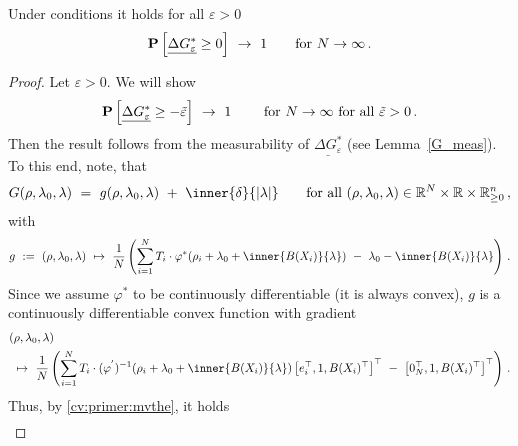  \begin{lemma}
   \label{bw:cd:lem2}
   Under conditions it holds
   for all $\varepsilon>0$
\begin{gather}
   \P
   \left[ 
     \underline{
     \Delta G^*
     _\varepsilon
     }
     \ge 
     0
   \right]
   \ 
   \to
   \ 
   1
   \qquad
   \text{for}
   \ 
   N\to\infty
   \,.
\end{gather}
 \end{lemma}
 \begin{proof}
   Let $\varepsilon>0$.
   We will show
\begin{gather}
   \P
   \left[ 
     \underline{
     \Delta G^*
     _\varepsilon
     }
     \ge 
     -\tilde{\varepsilon}
   \right]
   \ 
   \to
   \ 
   1
   \qquad
   \ 
   \text{for}
   \ 
   N\to\infty
   \ 
   \text{for all}\ 
   \tilde{\varepsilon}>0
   \,.
\end{gather}
Then the result follows from the measurability of 
$
     \underline{
     \Delta G^*
     _\varepsilon
     }
$
(see Lemma~\ref{G_meas}).
To this end, note, that
\begin{gather*}
  G(\rho,\lambda_0,\lambda)
  \ 
  =
  \ 
  g(\rho,\lambda_0,\lambda)
  \ 
  +
  \ 
  \inner{\delta}{|\lambda|}
  \qquad
  \text{for all}\ 
  (\rho,\lambda_0,\lambda)
  \in
  \R^{N}
  \times
  \R
  \times
  \R^n_{\ge 0}
  \,,
\end{gather*}
with
\begin{gather*}
  g
  \ 
  :=
  \ 
  (\rho,\lambda_0,\lambda)
  \ 
  \mapsto
  \ 
     \frac{1}{N}
     \left( 
\sum_{i=1} 
  ^N
  T_i
  \cdot
  \varphi^*
  \!
  \left( 
    \rho_i
    +
\lambda_0
+
\inner
{B(X_i)}
{
\lambda
}
  \right)
  \ 
  -
\ 
\lambda_0
-
\inner
{B(X_i)}
{
\lambda
}
     \right)
  \,.
\end{gather*}
Since we assume $\varphi^*$ to be continuously differentiable (it is always convex),
$g$ is a continuously differentiable convex function with gradient
\begin{align*}
  &
  (\rho,\lambda_0,\lambda)
  \\
  &
  \ 
  \mapsto
  \ 
     \frac{1}{N}
     \left( 
\sum_{i=1} 
  ^N
  T_i
  \cdot
  (
  \varphi^{'}
  )
  ^{-1}
  \!
  \left( 
    \rho_i
    +
\lambda_0
+
\inner
{B(X_i)}
{
\lambda
}
  \right)
  \left[ 
    e_i^\top,1,B(X_i)^\top
  \right]^\top
  \ 
  -
  \ 
  \left[ 
    0_N^\top,1,B(X_i)^\top
  \right]^\top
     \right)
  \,.
\end{align*}
Thus, by \eqref{cv:primer:mvthe},
it holds
\begin{align*}

\end{align*}
\end{proof}
